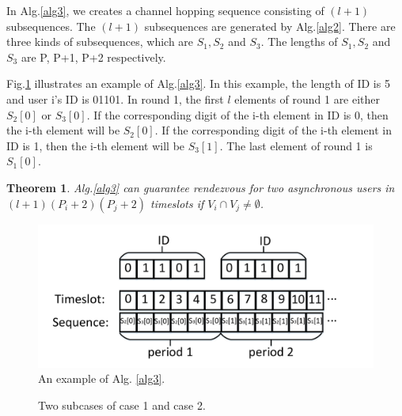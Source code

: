 \documentclass[10pt, conference, letterpaper]{IEEEtran}
\newtheorem{theorem}{Theorem}
\begin{document}
In Alg.\ref{alg3}, we creates a channel hopping sequence consisting of $(l +1)$ subsequences. The $(l +1)$ subsequences are generated by Alg.\ref{alg2}. There are three kinds of subsequences, which are $S_1, S_2$ and $S_3$. The lengths of $S_1, S_2$ and $S_3$ are P, P+1, P+2 respectively.

Fig.\ref{exp-alg3} illustrates an example of Alg.\ref{alg3}. In this example, the length of ID is 5 and user i's ID is 01101. In round 1, the first $ l$ elements of round 1 are either $S_2[0]$ or $S_3[0]$. If the corresponding digit of the i-th element in ID is 0, then the i-th element will be $S_2[0]$. If the corresponding digit of the i-th element in ID is 1, then the i-th element will be $S_3[1]$. The last element of round 1 is $S_1[0]$.

\begin{theorem}
\label{theo-alg3}
Alg.\ref{alg3} can guarantee rendezvous for two asynchronous users in $(l  + 1)(P_i + 2)(P_j + 2)$ timeslots if $V_i \cap V_j \ne \emptyset$.
\end{theorem}

\begin{figure}[!t]
\centering
\includegraphics[width=1\columnwidth]{round}
\caption{An example of Alg. {\ref{alg3}}.}
\label{exp-alg3}
\end{figure}


\begin{figure}
\centering
{}
\caption{Two subcases of case 1 and case 2.}
\label{case}
\end{figure}
\end{document}
